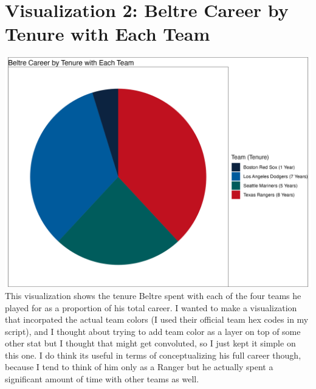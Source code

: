 \documentclass{article}
\begin{document}
\section{Visualization 2: Beltre Career by Tenure with Each Team}
    \centering
    \includegraphics[width=15cm]{PS6b_Felkner.png}
This visualization shows the tenure Beltre spent with each of the four teams he played for as a proportion of his total career. I wanted to make a visualization that incorpated the actual team colors (I used their official team hex codes in my script), and I thought about trying to add team color as a layer on top of some other stat but I thought that might get convoluted, so I just kept it simple on this one. I do think its useful in terms of conceptualizing his full career though, because I tend to think of him only as a Ranger but he actually spent a significant amount of time with other teams as well. 
\end{document}
